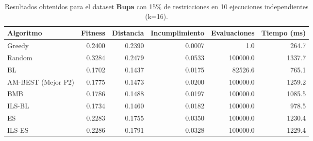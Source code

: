 \begin{table}[H]
    \centering
    \begin{tabular}{lrrrrr}
        \hline
        Algoritmo & Fitness & Distancia & Incumplimiento & Evaluaciones & Tiempo (ms)\\
        \hline
        Greedy & 0.2400 & 0.2390 & 0.0007 & 1.0 & 264.7 \\
        Random & 0.3284 & 0.2479 & 0.0533 & 100000.0 & 1337.7 \\
        BL & 0.1702 & 0.1437 & 0.0175 & 82526.6 & 765.1 \\
        AM-BEST (Mejor P2) & 0.1775 & 0.1473 & 0.0200 & 100000.0 & 1259.2 \\
        BMB & 0.1786 & 0.1488 & 0.0197 & 100000.0 & 1085.5 \\
        ILS-BL & 0.1734 & 0.1460 & 0.0182 & 100000.0 & 978.5 \\
        ES & 0.2283 & 0.1755 & 0.0350 & 100000.0 & 1230.4 \\
        ILS-ES & 0.2286 & 0.1791 & 0.0328 & 100000.0 & 1229.4 \\
        \hline
    \end{tabular}
    \caption{Resultados obtenidos para el dataset \textbf{Bupa} con 15\% de restricciones en  10 ejecuciones independientes (k=16).}
    \label{tab:res_bupa_15}
\end{table}